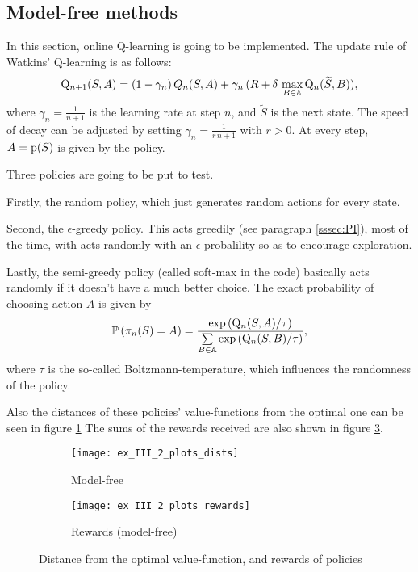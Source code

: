 
\subsection{Model-free methods}\label{ssec:model-free}

In this section, online Q-learning is going to be implemented.
The update rule of Watkins' Q-learning is as follows:
\begin{equation}
	\mathrm{Q}_{n+1}(S,A)=(1-\gamma_n)\,Q_n(S, A) + \gamma_n\,(R + \delta\,\max\limits_{B\in\mathbb{A}}\mathrm{Q}_n(\widetilde{S},B)),
\end{equation}
where $\gamma_n=\frac{1}{n+1}$ is the learning rate at step $n$,
and $\widetilde{S}$ is the next state. The speed of decay can be adjusted by setting
$\gamma_n=\frac{1}{r\,n+1}$ with $r>0$.
At every step, $A=\mathrm{p}(S)$ is given by the policy.

Three policies are going to be put to test.

Firstly, the random policy, which just generates random actions for every state.

Second, the $\epsilon$-greedy policy. This acts greedily (see paragraph \ref{sssec:PI}),
most of the time, with acts randomly with an $\epsilon$ probalility so as to
encourage exploration.

Lastly, the semi-greedy policy (called soft-max in the code) basically acts randomly
if it doesn't have a much better choice. The exact probability of choosing action $A$
is given by
\begin{equation}
	\mathbb{P}\left(\pi_n(S)=A\right) =
	\frac{\exp\left(\mathrm{Q}_n(S, A)/\tau\right)}
	{\sum\limits_{B\in\mathbb{A}}\exp\left(\mathrm{Q}_n(S, B)/\tau\right)},
\end{equation}
where $\tau$ is the so-called Boltzmann-temperature, which influences
the randomness of the policy.

Also the distances of these policies' value-functions from the optimal one
can be seen in figure \ref{fig:dist-2}
The sums of the rewards received are also shown in figure \ref{fig:rewards}.

\begin{figure}[H]
	\centering
	\begin{subfigure}{.45\textwidth}
		\centering
		\texttt{[image: ex\_III\_2\_plots\_dists]}
		\caption{Model-free}
		\label{fig:dist-2}
	\end{subfigure}
	\begin{subfigure}{.45\textwidth}
		\centering
		\texttt{[image: ex\_III\_2\_plots\_rewards]}
		\caption{Rewards (model-free)}
		\label{fig:rewards}
	\end{subfigure}
	\caption{Distance from the optimal value-function, and rewards of policies}
\end{figure}


